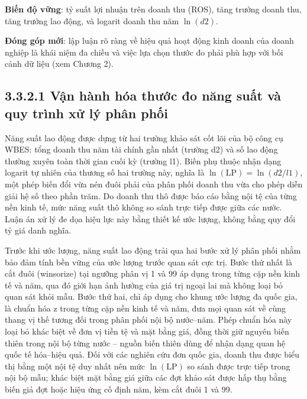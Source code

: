 \documentclass[
  a4paper,
  13pt]{extreport}
\begin{document}
\textbf{Biến độ vững}: tỷ suất lợi nhuận trên doanh thu
(\(\mathrm{ROS}\)), tăng trưởng doanh thu, tăng trưởng lao động, và
logarit doanh thu năm \(\ln(d2)\).

\textbf{Đóng góp mới}: lập luận rõ ràng về hiệu quả hoạt động kinh doanh
của doanh nghiệp là khái niệm đa chiều và việc lựa chọn thước đo phải
phù hợp với bối cảnh dữ liệu (xem Chương 2).

\hypertarget{vux1eadn-huxe0nh-huxf3a-thux1b0ux1edbc-ux111o-nux103ng-suux1ea5t-vuxe0-quy-truxecnh-xux1eed-luxfd-phuxe2n-phux1ed1i}{%
\subsection{3.3.2.1 Vận hành hóa thước đo năng suất và quy trình xử lý
phân
phối}\label{vux1eadn-huxe0nh-huxf3a-thux1b0ux1edbc-ux111o-nux103ng-suux1ea5t-vuxe0-quy-truxecnh-xux1eed-luxfd-phuxe2n-phux1ed1i}}

Năng suất lao động được dựng từ hai trường khảo sát cốt lõi của bộ công
cụ WBES: tổng doanh thu năm tài chính gần nhất (trường d2) và số lao
động thường xuyên toàn thời gian cuối kỳ (trường l1). Biến phụ thuộc
nhận dạng logarit tự nhiên của thương số hai trường này, nghĩa là
\(\ln(\mathrm{LP}) = \ln(d2 / l1)\), một phép biến đổi vừa nén đuôi phải
của phân phối doanh thu vừa cho phép diễn giải hệ số theo phần trăm. Do
doanh thu thô được báo cáo bằng nội tệ của từng nền kinh tế, mức năng
suất thô không so sánh trực tiếp được giữa các nước. Luận án xử lý đe
dọa hiệu lực này bằng thiết kế ước lượng, không bằng quy đổi tỷ giá danh
nghĩa.

Trước khi ước lượng, năng suất lao động trải qua hai bước xử lý phân
phối nhằm bảo đảm tính bền vững của ước lượng trước quan sát cực trị.
Bước thứ nhất là cắt đuôi (winsorize) tại ngưỡng phân vị 1 và 99 áp dụng
trong từng cặp nền kinh tế và năm, qua đó giới hạn ảnh hưởng của giá trị
ngoại lai mà không loại bỏ quan sát khỏi mẫu. Bước thứ hai, chỉ áp dụng
cho khung ước lượng đa quốc gia, là chuẩn hóa z trong từng cặp nền kinh
tế và năm, đưa mọi quan sát về cùng thang vị thế tương đối trong phân
phối nội bộ nước--năm. Phép chuẩn hóa này loại bỏ khác biệt về đơn vị
tiền tệ và mặt bằng giá, đồng thời giữ nguyên biến thiên trong nội bộ
từng nước -- nguồn biến thiên dùng để nhận dạng quan hệ quốc tế
hóa--hiệu quả. Đối với các nghiên cứu đơn quốc gia, doanh thu được biểu
thị bằng một nội tệ duy nhất nên mức \(\ln(\mathrm{LP})\) so sánh được
trực tiếp trong nội bộ mẫu; khác biệt mặt bằng giá giữa các đợt khảo sát
được hấp thụ bằng biến giả đợt hoặc hiệu ứng cố định năm, kèm cắt đuôi 1
và 99.
\end{document}
